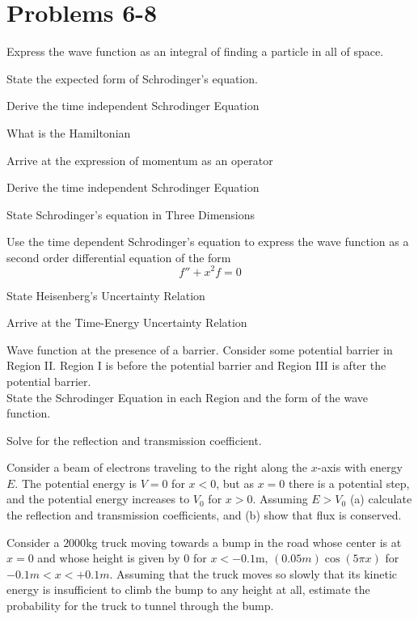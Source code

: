 \section{Problems 6-8}
\begin{q}
	Express the wave function as an integral of finding a particle in all of space.
\end{q}
\begin{q}
	State the expected form of Schrodinger's equation.
\end{q}
\begin{q}
	Derive the time independent Schrodinger Equation
\end{q}
\begin{q}
	What is the Hamiltonian
\end{q}
\begin{q}
	Arrive at the expression of momentum as an operator
\end{q}
\begin{q}
	Derive the time independent Schrodinger Equation
\end{q}
\begin{q}
	State Schrodinger's equation in Three Dimensions
\end{q}
\begin{q}
	Use the time dependent Schrodinger's equation to express the wave function as a second order differential equation of the form 
	\[ f'' + x^2f = 0 \]
\end{q}
\begin{q}
	State Heisenberg's Uncertainty Relation
\end{q}
\begin{q}
	Arrive at the Time-Energy Uncertainty Relation
\end{q}
\begin{q}
	Wave function at the presence of a barrier. Consider some potential barrier in Region II. Region I is before the potential barrier and Region III is after the potential barrier.\\
	State the Schrodinger Equation in each Region and the form of the wave function.
\end{q}
\begin{q}
	Solve for the reflection and transmission coefficient.
\end{q}
\begin{q}
	Consider a beam of electrons traveling to the right along the $ x$-axis with energy $ E $. The potential energy is $ V = 0 $ for $ x < 0 $, but as $ x = 0 $ there is a potential step, and the potential energy increases to $ V_0 $ for $ x > 0 $. Assuming $ E > V_0 $ (a) calculate the reflection and transmission coefficients, and (b) show that flux is conserved. 
\end{q}
\begin{q}
	Consider a $ 2000 $kg truck moving towards a bump in the road whose center is at $ x = 0 $ and whose height is given by $ 0 $ for $ x<-0.1 $m, $ (0.05m)\cos(5 \pi x)  $ for $ -0.1m < x < +0.1m $. Assuming that the truck moves so slowly that its kinetic energy is insufficient to climb the bump to any height at all, estimate the probability for the truck to tunnel through the bump.
\end{q}
